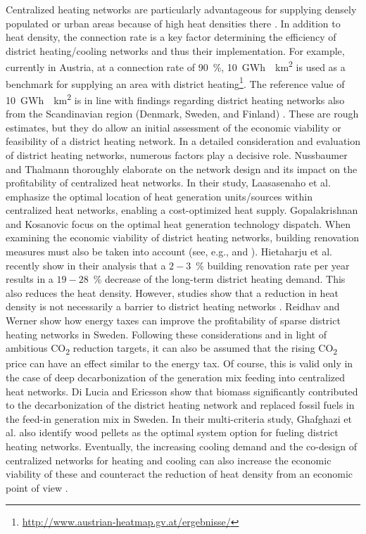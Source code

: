 Centralized heating networks are particularly advantageous for supplying densely populated or urban areas because of high heat densities there \cite{inage2020development}. In addition to heat density, the connection rate is a key factor determining the efficiency of district heating/cooling networks and thus their implementation. For example, currently in Austria, at a connection rate of \SI{90}{\%}, \SI{10}{GWh \per km^2} is used as a benchmark for supplying an area with district heating\footnote{\url{http://www.austrian-heatmap.gv.at/ergebnisse/}}. The reference value of \SI{10}{GWh \per km^2} is in line with findings regarding district heating networks also from the Scandinavian region (Denmark, Sweden, and Finland) \cite{zinko2008district}. These are rough estimates, but they do allow an initial assessment of the economic viability or feasibility of a district heating network. In a detailed consideration and evaluation of district heating networks, numerous factors play a decisive role. Nussbaumer and Thalmann \cite{nussbaumer2016influence} thoroughly elaborate on the network design and its impact on the profitability of centralized heat networks. In their study, Laasasenaho et al. \cite{laasasenaho2019gis} emphasize the optimal location of heat generation units/sources within centralized heat networks, enabling a cost-optimized heat supply. Gopalakrishnan and Kosanovic \cite{gopalakrishnan2014economic} focus on the optimal heat generation technology dispatch. When examining the economic viability of district heating networks, building renovation measures must also be taken into account (see, e.g., \cite{andric2018impact} and \cite{rabani2021achieving}). Hietaharju et al. \cite{hietaharju2021stochastic} recently show in their analysis that a $2-3$\SI{}{\%} building renovation rate per year results in a $19-28$\SI{}{\%} decrease of the long-term district heating demand. This also reduces the heat density. However, studies show that a reduction in heat density is not necessarily a barrier to district heating networks \cite{persson2011heat}. Reidhav and Werner \cite{reidhav2008profitability} show how energy taxes can improve the profitability of sparse district heating networks in Sweden. Following these considerations and in light of ambitious CO\textsubscript{2} reduction targets, it can also be assumed that the rising CO\textsubscript{2} price can have an effect similar to the energy tax. Of course, this is valid only in the case of deep decarbonization of the generation mix feeding into centralized heat networks. Di Lucia and Ericsson \cite{di2014low} show that biomass significantly contributed to the decarbonization of the district heating network and replaced fossil fuels in the feed-in generation mix in Sweden. In their multi-criteria study, Ghafghazi et al. \cite{ghafghazi2010multicriteria} also identify wood pellets as the optimal system option for fueling district heating networks. Eventually, the increasing cooling demand and the co-design of centralized networks for heating and cooling can also increase the economic viability of these and counteract the reduction of heat density from an economic point of view \cite{zhang2021economic}.


